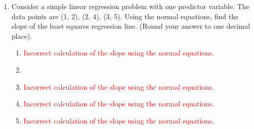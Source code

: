 \documentclass{article}%
\newcommand{\incorrect}[1]{\textcolor{red}{#1}}
\begin{document}
\begin{enumerate}
\begin{enumerate}
\item \incorrect{Incorrect calculation of the slope.}%
\item \incorrect{Incorrect calculation of the slope.}%
\item \incorrect{Incorrect calculation of the slope.}%
\end{enumerate}%
\vspace{1em}%
\item Consider a simple linear regression problem with one predictor variable. The data points are (1, 2), (2, 4), (3, 5). Using the normal equations, find the slope of the least squares regression line. (Round your answer to one decimal place).%
\begin{enumerate}%
\item \incorrect{Incorrect calculation of the slope using the normal equations.}%
\item \incorrect{}%
\item \incorrect{Incorrect calculation of the slope using the normal equations.}%
\item \incorrect{Incorrect calculation of the slope using the normal equations.}%
\item \incorrect{Incorrect calculation of the slope using the normal equations.}%
\end{enumerate}%
\vspace{1em}%
\end{enumerate}

%
\end{document}
